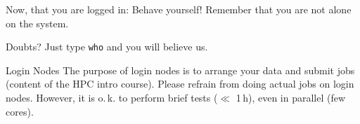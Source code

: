 \setcounter{interlude}{\value{preframe_interlude}}
\begin{frame}[fragile]
	\setcounter{preframe_interlude}{\value{interlude}}
	\frametitle{}
	Now, that you are logged in: Behave yourself! Remember that you are not alone on the system.
	\pause
	\begin{block}{Doubts?}
		Just type \verb+who+ and you will believe us.
	\end{block}
	\pause
	\begin{alertblock}{Login Nodes}
		The purpose of login nodes is to arrange your data and submit jobs (content of the HPC intro course). Please refrain from doing actual jobs on login nodes. However, it is o.\,k. to perform brief tests ($\ll$ 1\,h), even in parallel (few cores).
	\end{alertblock}
\end{frame}
